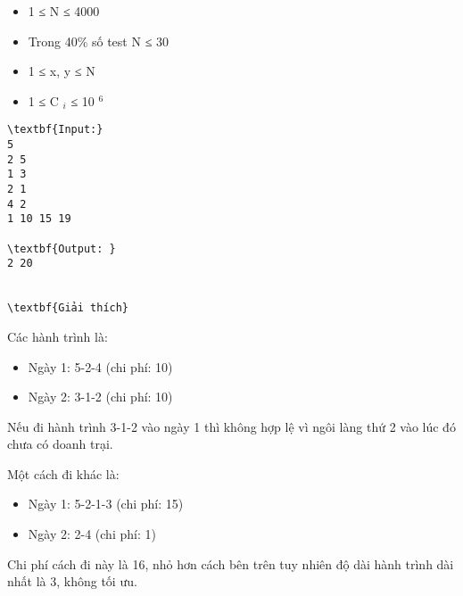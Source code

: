\begin{itemize}
	\item 1 ≤ N ≤ 4000
	\item Trong 40\% số test N ≤ 30
	\item 1 ≤ x, y ≤ N
	\item 1 ≤ C $_ i $ ≤ 10 $^ 6 $
\end{itemize}
\begin{itemize}
\end{itemize}
\begin{verbatim}
\textbf{Input:}
5
2 5
1 3
2 1
4 2
1 10 15 19

\textbf{Output: }
2 20


\textbf{Giải thích}\end{verbatim}

Các hành trình là:
\begin{itemize}
	\item Ngày 1: 5-2-4 (chi phí: 10)
	\item Ngày 2: 3-1-2 (chi phí: 10)
\end{itemize}

Nếu đi hành trình 3-1-2 vào ngày 1 thì không hợp lệ vì ngôi làng thứ 2 vào lúc đó chưa có doanh trại.

Một cách đi khác là:
\begin{itemize}
	\item Ngày 1: 5-2-1-3 (chi phí: 15)
	\item Ngày 2: 2-4 (chi phí: 1)
\end{itemize}

Chi phí cách đi này là 16, nhỏ hơn cách bên trên tuy nhiên độ dài hành trình dài nhất là 3, không tối ưu.
\begin{itemize}
\end{itemize}